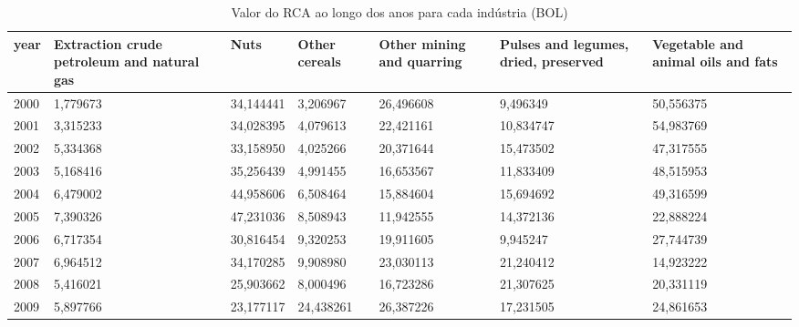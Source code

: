 \begin{table}
\centering
\caption{Valor do RCA ao longo dos anos para cada indústria (BOL)}
\begin{tabular}{p{1cm}p{2cm}p{2cm}p{2cm}p{2cm}p{2cm}p{2cm}}
\toprule
 year &  Extraction crude petroleum and natural gas &      Nuts &  Other cereals &  Other mining and quarring &  Pulses and legumes, dried, preserved &  Vegetable and animal oils and fats \\
\midrule
 2000 &                                    1,779673 & 34,144441 &       3,206967 &                  26,496608 &                              9,496349 &                           50,556375 \\
 2001 &                                    3,315233 & 34,028395 &       4,079613 &                  22,421161 &                             10,834747 &                           54,983769 \\
 2002 &                                    5,334368 & 33,158950 &       4,025266 &                  20,371644 &                             15,473502 &                           47,317555 \\
 2003 &                                    5,168416 & 35,256439 &       4,991455 &                  16,653567 &                             11,833409 &                           48,515953 \\
 2004 &                                    6,479002 & 44,958606 &       6,508464 &                  15,884604 &                             15,694692 &                           49,316599 \\
 2005 &                                    7,390326 & 47,231036 &       8,508943 &                  11,942555 &                             14,372136 &                           22,888224 \\
 2006 &                                    6,717354 & 30,816454 &       9,320253 &                  19,911605 &                              9,945247 &                           27,744739 \\
 2007 &                                    6,964512 & 34,170285 &       9,908980 &                  23,030113 &                             21,240412 &                           14,923222 \\
 2008 &                                    5,416021 & 25,903662 &       8,000496 &                  16,723286 &                             21,307625 &                           20,331119 \\
 2009 &                                    5,897766 & 23,177117 &      24,438261 &                  26,387226 &                             17,231505 &                           24,861653 \\

\end{tabular}
\end{table}
